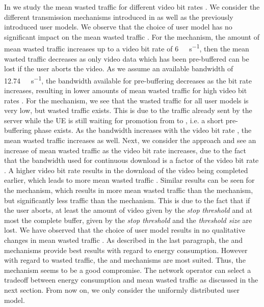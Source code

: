 In  we study the mean wasted traffic \meanwastedtraffic for different video bit rates \bitrate.
We consider the different transmission mechanisms introduced in  as well as the previously introduced user models.
We observe that the choice of user model has no significant impact on the mean wasted traffic \meanwastedtraffic.
For the \download mechanism, the amount of mean wasted traffic \meanwastedtraffic increases up to a video bit rate \bitrate of \SI{6}{\mega\bit\per\second}, then the mean wasted traffic \meanwastedtraffic decreases as only video data which has been pre-buffered can be lost if the user aborts the video.
As we assume an available bandwidth of \SI{12.74}{\mega\bit\per\second}, the bandwidth available for pre-buffering decreases as the bit rate \bitrate increases, resulting in lower amounts of mean wasted traffic \meanwastedtraffic for high video bit rates \bitrate.
For the \live mechanism, we see that the wasted traffic for all user models is very low, but wasted traffic exists.
This is due to the traffic already sent by the server while the \gls{UE} is still waiting for promotion from \rrcidle to \rrcconnected, i.e. a short pre-buffering phase exists.
As the bandwidth increases with the video bit rate \bitrate, the mean wasted traffic \meanwastedtraffic increases as well.
Next, we consider the \serviceprovisioning approach and see an increase of mean wasted traffic \meanwastedtraffic as the video bit rate \bitrate increases, due to the fact that the bandwidth used for continuous download is a factor of the video bit rate \bitrate.
A higher video bit rate \bitrate results in the download of the video being completed earlier, which leads to more mean wasted traffic \meanwastedtraffic.
Similar results can be seen for the \streaming mechanism, which results in more mean wasted traffic \meanwastedtraffic than the \live mechanism, but significantly less traffic than the \serviceprovisioning mechanism.
This is due to the fact that if the user aborts, at least the amount of video given by the \emph{stop threshold} \bufferlower and at most the complete buffer, given by the \emph{stop threshold} and the \emph{threshold size} are lost.
We have observed that the choice of user model results in no qualitative changes in mean wasted traffic \meanwastedtraffic.
As described in the last paragraph, the \download and \streaming mechanisms provide best results with regard to energy consumption.
However with regard to wasted traffic, the \live and \streaming mechanisms are most suited.
Thus, the \streaming mechanism seems to be a good compromise.
The network operator can select a tradeoff between energy consumption and mean wasted traffic \meanwastedtraffic as discussed in the next section.
From now on, we only consider the uniformly distributed user model.

